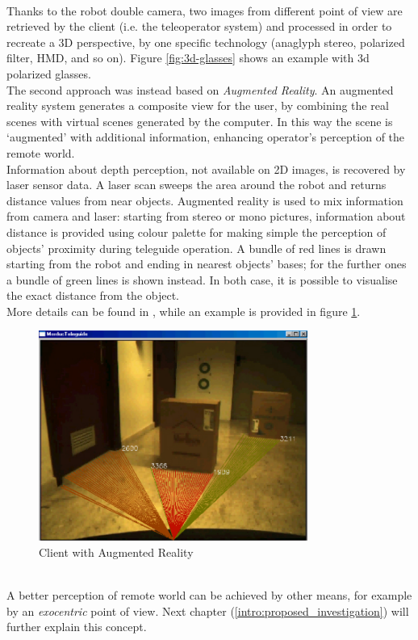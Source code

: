 \\
Thanks to the robot double camera, two images from different point of
view are retrieved by the client (i.e. the teleoperator system) and
processed in order to recreate a 3D perspective, by one specific
technology (anaglyph stereo, polarized filter, HMD, and so on).
Figure \ref{fig:3d-glasses} shows an example with 3d polarized
glasses.
\\
The second approach was instead based on \textit{Augmented Reality}.
An augmented reality system generates a composite view for the user,
by combining the real scenes with virtual scenes generated by the
computer. In this way the scene is `augmented' with additional
information, enhancing operator's perception of the remote world.
\\
Information about depth perception, not available on
2D images, is recovered by laser sensor data. A laser scan sweeps the area
around the robot and returns distance values from near objects. Augmented
reality is used to mix information from camera and laser: starting from
stereo or mono pictures, information about distance is provided using colour
palette for making simple the perception of objects' proximity during
teleguide operation. A bundle of red lines is drawn starting from the robot
and ending in nearest objects' bases; for the further ones a bundle of green
lines is shown instead. In both case, it is possible to visualise the
exact distance from the object.
\\
More details can be found in \cite{morduc:macalusodetommaso}, while an
example is provided in figure \ref{fig:augmented_morduc}.
\begin{figure} [h]
  \begin{center}
    \includegraphics[width=250pt]{img/augmented_morduc.png}
    \caption{Client with Augmented Reality}
    \label{fig:augmented_morduc}
  \end{center}
\end{figure}
\\
A better perception of remote world can be achieved by other means,
for example by an \textit{exocentric} point of view. Next chapter
(\ref{intro:proposed_investigation}) will further explain this concept.
